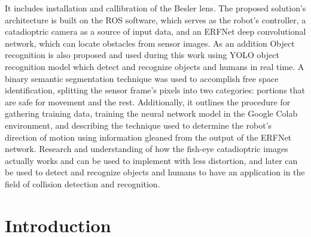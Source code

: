\documentclass[11pt, a4paper, openany]{book}
\begin{document}
\newline
It includes installation and callibration of the Besler lens. The proposed solution's architecture is built on the ROS software, which serves as the robot's controller, a catadioptric camera as a source of input data, and an ERFNet deep convolutional network, which can locate obstacles from sensor images. \newline
As an addition Object recognition is also proposed and used during this work using YOLO object recognition model which detect and recognize objects and humans in real time.
A binary semantic segmentation technique was used to accomplish free space identification, splitting the sensor frame's pixels into two categories: portions that are safe for movement and the rest. Additionally, it outlines the procedure for gathering training data, training the neural network model in the Google Colab environment, and describing the technique used to determine the robot's direction of motion using information gleaned from the output of the ERFNet network.\newline
Research and understanding of how the fish-eye catadioptric images actually works and can be used to implement with less distortion, and later can be used to detect and recognize objects and humans to have an application in the field of collision detection and recognition.



%
%
\chapter{Introduction}
\end{document}
